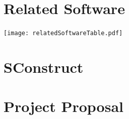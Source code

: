 \documentclass[12pt,a4paper,twoside,openright]{report}
\begin{document}


\appendix
\chapter{Related Software}
\begin{center}
\texttt{[image: relatedSoftwareTable.pdf]}
\end{center}

\chapter{SConstruct}


\chapter{Project Proposal}

\end{document}
